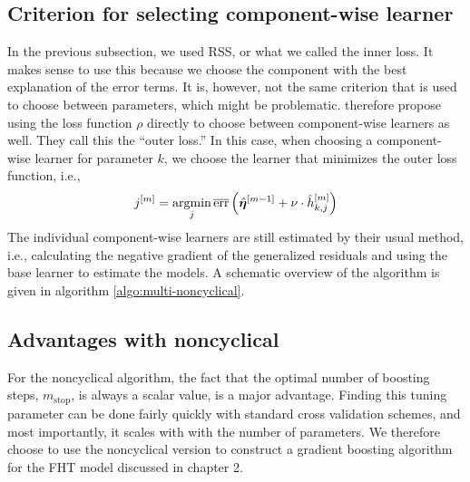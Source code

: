 \subsection{Criterion for selecting component-wise learner}
In the previous subsection, we used RSS, or what we called the inner loss.
It makes sense to use this because we choose the component with the best explanation of the error terms.
It is, however, not the same criterion that is used to choose between parameters, which might be problematic.
\citet{thomas2018} therefore propose using the loss function $\rho$ directly to choose between component-wise learners as well.
They call this the ``outer loss.''
In this case, when choosing a component-wise learner for parameter $k$, we choose the learner that minimizes the outer loss function, i.e., 
\begin{equation*}
    j^{[m]}=\operatorname*{argmin}_{j} \overline{\text{err}}\left(\hat{\boldsymbol{\eta}}^{[m-1]} + \nu\cdot \hat{h}^{[m]}_{k,j} \right)
\end{equation*}
The individual component-wise learners are still estimated by their usual method, i.e., calculating the negative gradient of the generalized residuals and using the base learner to estimate the models.
A schematic overview of the algorithm is given in algorithm \ref{algo:multi-noncyclical}.

\subsection{Advantages with noncyclical}
For the noncyclical algorithm, the fact that the optimal number of boosting steps, $m_{\text{stop}}$, is always a scalar value, is a major advantage.
Finding this tuning parameter can be done fairly quickly with standard cross validation schemes, and most importantly, it scales with with the number of parameters.
We therefore choose to use the noncyclical version to construct a gradient boosting algorithm for the FHT model discussed in chapter 2.


